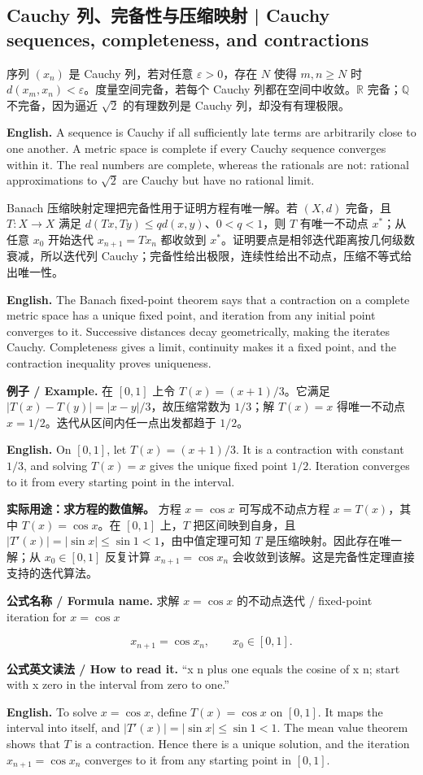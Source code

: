 \documentclass[UTF8,11pt,a4paper]{ctexart}
\newcommand{\EN}[1]{\par\noindent\textbf{English.} #1\par}
\newcommand{\READ}[1]{\par\noindent\textbf{公式英文读法 / How to read it.} #1\par}
\let\APSsubsection\subsection
\renewcommand{\subsection}[1]{\Needspace{6\baselineskip}\APSsubsection{#1}}
\newcommand{\FORMULA}[2]{\par\Needspace{3\baselineskip}\noindent\textbf{公式名称 / Formula name.} #1 / #2\par}
\newcommand{\EX}[2]{\par\noindent\textbf{例子 / Example.} #1\par\EN{#2}}
\begin{document}
\subsection{Cauchy 列、完备性与压缩映射 | Cauchy sequences, completeness, and contractions}
\noindent 序列 $(x_n)$ 是 Cauchy 列，若对任意 $\varepsilon>0$，存在 $N$ 使得 $m,n\ge N$ 时 $d(x_m,x_n)<\varepsilon$。度量空间完备，若每个 Cauchy 列都在空间中收敛。$\mathbb R$ 完备；$\mathbb Q$ 不完备，因为逼近 $\sqrt2$ 的有理数列是 Cauchy 列，却没有有理极限。
\EN{A sequence is Cauchy if all sufficiently late terms are arbitrarily close to one another. A metric space is complete if every Cauchy sequence converges within it. The real numbers are complete, whereas the rationals are not: rational approximations to $\sqrt2$ are Cauchy but have no rational limit.}
\noindent Banach 压缩映射定理把完备性用于证明方程有唯一解。若 $(X,d)$ 完备，且 $T:X\to X$ 满足 $d(Tx,Ty)\le qd(x,y)$、$0<q<1$，则 $T$ 有唯一不动点 $x^*$；从任意 $x_0$ 开始迭代 $x_{n+1}=Tx_n$ 都收敛到 $x^*$。证明要点是相邻迭代距离按几何级数衰减，所以迭代列 Cauchy；完备性给出极限，连续性给出不动点，压缩不等式给出唯一性。
\EN{The Banach fixed-point theorem says that a contraction on a complete metric space has a unique fixed point, and iteration from any initial point converges to it. Successive distances decay geometrically, making the iterates Cauchy. Completeness gives a limit, continuity makes it a fixed point, and the contraction inequality proves uniqueness.}
\EX{在 $[0,1]$ 上令 $T(x)=(x+1)/3$。它满足 $|T(x)-T(y)|=|x-y|/3$，故压缩常数为 $1/3$；解 $T(x)=x$ 得唯一不动点 $x=1/2$。迭代从区间内任一点出发都趋于 $1/2$。}{On $[0,1]$, let $T(x)=(x+1)/3$. It is a contraction with constant $1/3$, and solving $T(x)=x$ gives the unique fixed point $1/2$. Iteration converges to it from every starting point in the interval.}
\noindent\textbf{实际用途：求方程的数值解。} 方程 $x=\cos x$ 可写成不动点方程 $x=T(x)$，其中 $T(x)=\cos x$。在 $[0,1]$ 上，$T$ 把区间映到自身，且 $|T'(x)|=|\sin x|\le\sin1<1$，由中值定理可知 $T$ 是压缩映射。因此存在唯一解；从 $x_0\in[0,1]$ 反复计算 $x_{n+1}=\cos x_n$ 会收敛到该解。这是完备性定理直接支持的迭代算法。
\FORMULA{求解 $x=\cos x$ 的不动点迭代}{fixed-point iteration for $x=\cos x$}
\[
x_{n+1}=\cos x_n,\qquad x_0\in[0,1].
\]
\READ{“x n plus one equals the cosine of x n; start with x zero in the interval from zero to one.”}
\EN{To solve $x=\cos x$, define $T(x)=\cos x$ on $[0,1]$. It maps the interval into itself, and $|T'(x)|=|\sin x|\le\sin1<1$. The mean value theorem shows that $T$ is a contraction. Hence there is a unique solution, and the iteration $x_{n+1}=\cos x_n$ converges to it from any starting point in $[0,1]$.}
\end{document}
